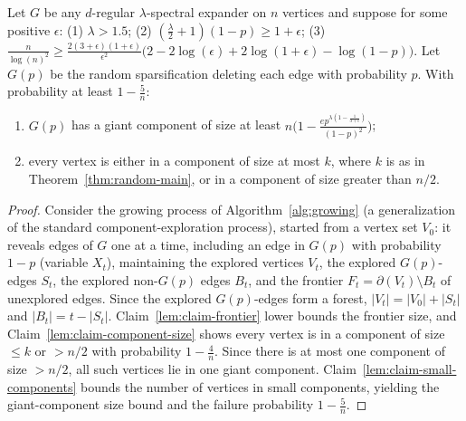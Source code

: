 \begin{theorem}
  \label{thm:sparsification}
  Let $G$ be any $d$-regular $\lambda$-spectral expander on $n$ vertices and
  suppose for some positive $\epsilon$:
  (1) $\lambda > 1.5$;
  (2) $(\tfrac{\lambda}{2}+1)(1-p) \ge 1 + \epsilon$;
  (3) $\tfrac{n}{\log(n)^2} \ge \tfrac{2(3+\epsilon)(1+\epsilon)}{\epsilon^2}
   \big(2 - 2\log(\epsilon) + 2\log(1+\epsilon) - \log(1-p)\big)$.
  Let $G(p)$ be the random sparsification deleting each edge with probability
  $p$. With probability at least $1 - \tfrac{5}{n}$:
  \begin{enumerate}
    \item $G(p)$ has a giant component of size at least
      $n\Big(1 - \tfrac{e p^{\lambda(1-\frac{1}{3+\epsilon})}}{(1-p)^2}\Big)$;
    \item every vertex is either in a component of size at most $k$, where $k$ is
      as in Theorem~\ref{thm:random-main}, or in a component of size greater than
      $n/2$.
  \end{enumerate}
\end{theorem}
\begin{proof}
  Consider the growing process of Algorithm~\ref{alg:growing} (a generalization
  of the standard component-exploration process), started from a vertex set
  $V_0$: it reveals edges of $G$ one at a time, including an edge in $G(p)$ with
  probability $1-p$ (variable $X_t$), maintaining the explored vertices $V_t$, the
  explored $G(p)$-edges $S_t$, the explored non-$G(p)$ edges $B_t$, and the
  frontier $F_t = \partial(V_t)\setminus B_t$ of unexplored edges. Since the
  explored $G(p)$-edges form a forest, $|V_t| = |V_0| + |S_t|$ and
  $|B_t| = t - |S_t|$. Claim~\ref{lem:claim-frontier} lower bounds the frontier
  size, and Claim~\ref{lem:claim-component-size} shows every vertex is in a
  component of size $\le k$ or $> n/2$ with probability $1 - \tfrac{4}{n}$. Since
  there is at most one component of size $> n/2$, all such vertices lie in one
  giant component. Claim~\ref{lem:claim-small-components} bounds the number of
  vertices in small components, yielding the giant-component size bound and the
  failure probability $1 - \tfrac{5}{n}$.
\end{proof}

